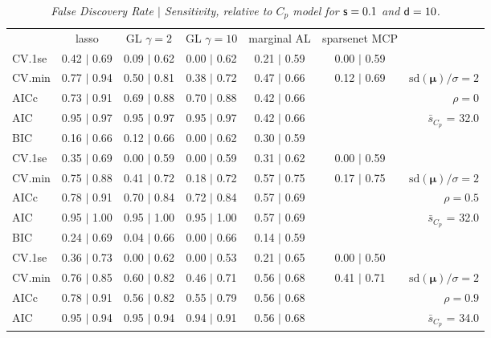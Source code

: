 \documentclass[12pt]{article}
\newcommand{\mr}[1]{\mathrm{#1}}
\newcommand{\bm}[1]{\mathbf{#1}}
\begin{document}
\begin{table}[p]\vspace{-.5cm}
\caption[l]{\label{sens}\it False Discovery Rate $\mid$ Sensitivity, relative to $C_p$ model  for ${\sf s}=0.1$ and ${\sf d}=10$.}
\vspace{-.5cm}
\small{}
\begin{center}
\begin{tabular}{l*{5}{c}|r}
 & lasso & GL $\gamma=2$ & GL $\gamma=10$ & marginal AL & sparsenet MCP  & \\
 \cline{1-7}
CV.1se & 0.42 $\mid$ 0.69 & 0.09 $\mid$ 0.62 & 0.00 $\mid$ 0.62 & 0.21 $\mid$ 0.59 & 0.00 $\mid$ 0.59 &\\
CV.min & 0.77 $\mid$ 0.94 & 0.50 $\mid$ 0.81 & 0.38 $\mid$ 0.72 & 0.47 $\mid$ 0.66 & 0.12 $\mid$ 0.69 &  $\mr{sd}(\bm{\mu})/\sigma=2$ \\
AICc & 0.73 $\mid$ 0.91 & 0.69 $\mid$ 0.88 & 0.70 $\mid$ 0.88 & 0.42 $\mid$ 0.66 & & $\rho=0$ \\
AIC & 0.95 $\mid$ 0.97 & 0.95 $\mid$ 0.97 & 0.95 $\mid$ 0.97 & 0.42 $\mid$ 0.66 & & \multirow{2}{*}{$\bar{s}_{C_p}$ = 32.0} \\
BIC & 0.16 $\mid$ 0.66 & 0.12 $\mid$ 0.66 & 0.00 $\mid$ 0.62 & 0.30 $\mid$ 0.59 & & \\
 \hline 
CV.1se & 0.35 $\mid$ 0.69 & 0.00 $\mid$ 0.59 & 0.00 $\mid$ 0.59 & 0.31 $\mid$ 0.62 & 0.00 $\mid$ 0.59 &\\
CV.min & 0.75 $\mid$ 0.88 & 0.41 $\mid$ 0.72 & 0.18 $\mid$ 0.72 & 0.57 $\mid$ 0.75 & 0.17 $\mid$ 0.75 &  $\mr{sd}(\bm{\mu})/\sigma=2$ \\
AICc & 0.78 $\mid$ 0.91 & 0.70 $\mid$ 0.84 & 0.72 $\mid$ 0.84 & 0.57 $\mid$ 0.69 & & $\rho=0.5$ \\
AIC & 0.95 $\mid$ 1.00 & 0.95 $\mid$ 1.00 & 0.95 $\mid$ 1.00 & 0.57 $\mid$ 0.69 & & \multirow{2}{*}{$\bar{s}_{C_p}$ = 32.0} \\
BIC & 0.24 $\mid$ 0.69 & 0.04 $\mid$ 0.66 & 0.00 $\mid$ 0.66 & 0.14 $\mid$ 0.59 & & \\
 \hline 
CV.1se & 0.36 $\mid$ 0.73 & 0.00 $\mid$ 0.62 & 0.00 $\mid$ 0.53 & 0.21 $\mid$ 0.65 & 0.00 $\mid$ 0.50 &\\
CV.min & 0.76 $\mid$ 0.85 & 0.60 $\mid$ 0.82 & 0.46 $\mid$ 0.71 & 0.56 $\mid$ 0.68 & 0.41 $\mid$ 0.71 &  $\mr{sd}(\bm{\mu})/\sigma=2$ \\
AICc & 0.78 $\mid$ 0.91 & 0.56 $\mid$ 0.82 & 0.55 $\mid$ 0.79 & 0.56 $\mid$ 0.68 & & $\rho=0.9$ \\
AIC & 0.95 $\mid$ 0.94 & 0.95 $\mid$ 0.94 & 0.94 $\mid$ 0.91 & 0.56 $\mid$ 0.68 & & \multirow{2}{*}{$\bar{s}_{C_p}$ = 34.0} \\

\end{tabular}
\end{center}
\end{table}
\end{document}
